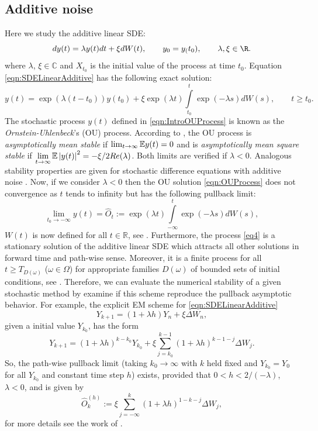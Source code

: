 	\subsection*{Additive noise}
	Here we study the additive linear SDE: 
	\begin{equation}\label{eqn:SDELinearAdditive}
		dy(t)=\lambda y(t)dt+ \xi  dW(t) , \qquad y_0=y_(t_0), \qquad \lambda, \xi \in \R.		
	\end{equation}
	where $\lambda$, $\xi \in \mathbb{C}$ and $X_{t_0}$ is the initial value of the process
	at time $t_0$. Equation \eqref{eqn:SDELinearAdditive}  has  the following  exact solution:
	\begin{equation}\label{eqn:IntroOUProcess}
	y(t)=\exp(\lambda (t-t_0)) y(t_0)+\xi 
	\exp(\lambda t)\int\limits_{t_0}^{t}\exp(-\lambda s)dW(s), 
	\qquad t\geq t_0.
	\end{equation}
	The stochastic process $y(t)$ defined in \eqref{eqn:IntroOUProcess} is known as 
	the {\it Ornstein-Uhlenbeck}'s (OU)  process. According to \cite{Hernandez1992},
	the OU process  is {\it asymptotically mean stable} if
	$ \lim_{t\to\infty}\mathbb{E}y(t)=0$ and is
	{\it  asymptotically  mean square stable} if
	$\displaystyle \lim_{t\to\infty}\mathbb{E}\left|y(t)\right|^2=-\xi/2Re(\lambda)$. Both 
	limits are verified if $\lambda<0$. 
	Analogous stability properties are given for 
	stochastic  difference equations with additive noise \cite{SaiotoPreprint}. 
	Now, if we consider $\lambda<0$ then the OU solution \eqref{eqn:OUProcess} does 
	not convergence as $t$ tends to infinity but has the following pullback limit:
	\begin{equation}\label{eq4}
		\lim_{t_0\to-\infty} y(t)=\widehat{O}_t:=
		\exp(\lambda t)\int\limits_{-\infty}^{t}\exp(-\lambda s)dW(s), 
	\end{equation}
	$W(t)$  is now defined for all $t\in\mathbb{R}$, see
	\cite{Arnold1998, kloeden1999towards}. Furthermore, the process \eqref{eq4} is a
	stationary solution  of the additive linear SDE which attracts all other solutions in
	forward time and path-wise sense. Moreover, it is a finite process for all $t\geq
	T_{D(\omega)}$ ($\omega\in \Omega$) for  appropriate families $D(\omega)$ of bounded
	sets of initial conditions, see \cite{Robinson2002}. Therefore, 
	we can evaluate the numerical stability of a given stochastic method by examine if 
	this scheme reproduce the pullback asymptotic behavior.
	For example, the explicit EM scheme for \eqref{eqn:SDELinearAdditive}
	$$
		Y_{k+1} = (1+\lambda h) Y_n + \xi \Delta W_n,	
	$$
	given a initial value $Y_{k_0}$, has the form
	$$
		Y_{k+1} = (1+\lambda h)^{k-k_0} Y_{k_0}
			+\xi \sum_{j=k_0}^{k-1} (1+\lambda h)^{k-1-j} \Delta W_j.
	$$
	So, the path-wise pullback limit (taking $k_0 \to \infty$  with $k$ held fixed and $Y_{k_0} = Y_0$ for
	all $Y_{k_0}$ and constant time step $h$) exists, provided that $0 <h< 2/(- \lambda)$, $\lambda <0$, and is given
	by
	$$
		\widehat{O}_k^{(h)} := 
			\xi \sum_{j= -\infty}^k
				(1+\lambda h)^{1-k-j} \Delta W_j,
	$$
	for more details see the work of
	\citet*{Buckwar2011a}.
	
